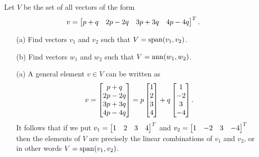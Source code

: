 \documentclass[a4paper]{amsart}
\renewenvironment{solution}{\SolutionInline}{\endSolutionInline}
\begin{document}
\begin{exercise}\label{ex-span-canonical-ii}
 Let $V$ be the set of all vectors of the form 
 \[ v = \left[\begin{matrix} p+q & 2p-2q & 3p+3q & 4p-4q \end{matrix}\right]^T. \]
 \begin{itemize}
  \item[(a)] Find vectors $v_1$ and $v_2$ such that
   $V=\operatorname{span}(v_1,v_2)$. 
  \item[(b)] Find vectors $w_1$ and $w_2$ such that
   $V=\operatorname{ann}(w_1,w_2)$. 
 \end{itemize}
\end{exercise}
\begin{solution}
 \begin{itemize}
  \item[(a)] A general element $v\in V$ can be written as
   \[ v = \left[\begin{matrix} p+q \\ 2p-2q \\ 3p+3q \\ 4p-4q \end{matrix}\right]
        = p \left[\begin{matrix} 1\\2\\3\\4 \end{matrix}\right] + q \left[\begin{matrix} 1\\-2\\3\\-4\end{matrix}\right]. 
   \]
   It follows that if we put $v_1=\left[\begin{matrix} 1&2&3&4\end{matrix}\right]^T$ and
   $v_2=\left[\begin{matrix} 1&-2&3&-4\end{matrix}\right]^T$ then the elements of $V$ are precisely
   the linear combinations of $v_1$ and $v_2$, or in other words
   $V=\operatorname{span}(v_1,v_2)$.  


\end{itemize}
\end{solution}
\end{document}
